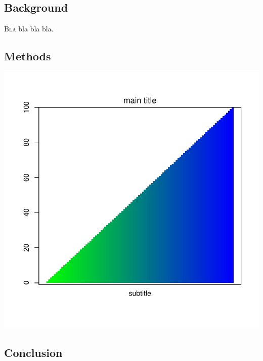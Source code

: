 \documentclass[11pt]{article}
\begin{document}
\begin{multicols}{2} 

\subsection*{Background}

\lettrine[nindent=0em,lines=3]{B}{la} bla bla bla.\cite{Cottler2014} \blindtext 

\subsection*{Methods}
\blindtext

\begin{center}
\includegraphics{final_project_proposal_joe_brew-001}
\end{center}

\subsection*{Conclusion}
\blindtext





\end{multicols}
\newpage


\end{document}
